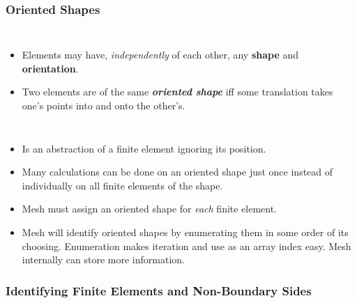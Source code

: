 \documentclass{beamer}
\begin{document}
\begin{frame}
  \frametitle{Oriented Shapes}
  \begin{columns}
      \pause
      \begin{itemize}[<+->]
        \item Elements may have, \emph{independently} of each other, any \textbf{shape} and \textbf{orientation}.
        \item Two elements are of the same \textbf{\emph{oriented shape}} iff some translation takes one's points into and onto the other's.
      \end{itemize}
  \end{columns}
  
  \begin{itemize}[<+->]
    \item Is an abstraction of a finite element ignoring its position.
    \item Many calculations can be done on an oriented shape just once instead of individually on all finite elements of the shape.
    \item Mesh must assign an oriented shape for \emph{each} finite element. 
    \item Mesh will identify oriented shapes by enumerating them in some order of its choosing.
      Enumeration makes iteration and use as an array index easy. Mesh internally can store more information.
  \end{itemize}
\end{frame}

\subsubsection{Identifying Finite Elements and Non-Boundary Sides}
\end{document}
